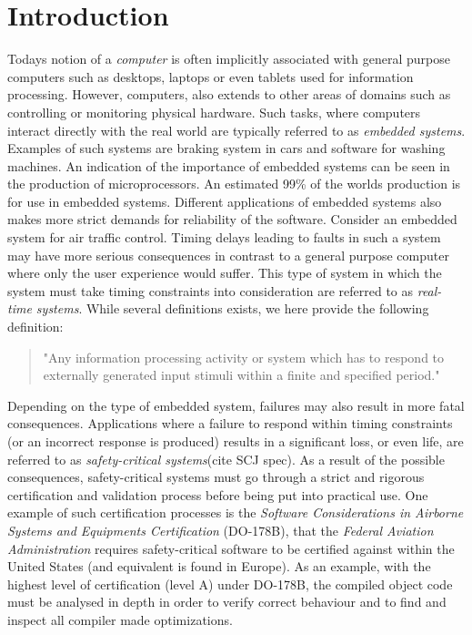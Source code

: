 \chapter{Introduction}
\label{chapter:introduction}
Todays notion of a \textit{computer} is often implicitly associated with general purpose computers such as desktops, laptops or even tablets used for information processing. However, computers, also extends to other areas of domains such as controlling or monitoring physical hardware. Such tasks, where computers interact directly with the real world are typically referred to as \textit{embedded systems}. Examples of such systems are braking system in cars and software for washing machines. An indication of the importance of embedded systems can be seen in the production of microprocessors. An estimated 99\% of the worlds production is for use in embedded systems\cite{alan2001real}. Different applications of embedded systems also makes more strict demands for reliability of the software. Consider an embedded system for air traffic control. Timing delays leading to faults in such a system may have more serious consequences in contrast to a general purpose computer where only the user experience would suffer. This type of system in which the system must take timing constraints into consideration are referred to as \textit{real-time systems}. While several definitions exists, we here provide the following definition:

\begin{quotation}
"Any information processing activity or system which has to respond to externally generated input stimuli within a finite and specified period." \cite{alan2001real}
\end{quotation}

Depending on the type of embedded system, failures may also result in more fatal consequences. Applications where a failure to respond within timing constraints (or an incorrect response is produced) results in a significant loss, or even life, are referred to as \textit{safety-critical systems}(cite SCJ spec). As a result of the possible consequences, safety-critical systems must go through a strict and rigorous certification and validation process before being put into practical use. One example of such certification processes is the \textit{Software Considerations in Airborne Systems and Equipments Certification} (DO-178B)\cite{DO178B}, that the \textit{Federal Aviation Administration} requires safety-critical software to be certified against within the United States (and equivalent is found in Europe). As an example, with the highest level of certification (level A) under DO-178B, the compiled object code must be analysed in depth in order to verify correct behaviour and to find and inspect all compiler made optimizations\cite{DO178B-Example}.


